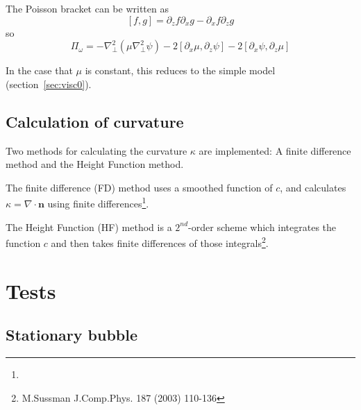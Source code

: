 \documentclass[12pt,a4paper]{article}
\newcommand{\lr}[1]{\left( #1 \right)}
\newcommand{\slr}[1]{\left[ #1 \right]}
\begin{document}
The Poisson bracket can be written as
\begin{equation}
\left[f, g\right] = \partial_zf\partial_xg - \partial_xf\partial_zg
\end{equation}
so
\begin{equation}
  \Pi_\omega = -\nabla_\perp^2\lr{\mu \nabla_\perp^2\psi} - 2\slr{\partial_x\mu,\partial_z\psi} - 2\slr{\partial_x\psi, \partial_z\mu}
\end{equation}

In the case that $\mu$ is constant, this reduces to the simple model (section~\ref{sec:visc0}).

\subsection{Calculation of curvature}
\label{sec:curvature}

Two methods for calculating the curvature $\kappa$ are implemented: A finite difference method and the Height Function method. 

The finite difference (FD) method uses a smoothed function of $c$, and calculates $\kappa = \nabla\cdot\mathbf{n}$ using finite differences\footnote{}.

The Height Function (HF) method is a $2^{nd}$-order scheme which integrates the function $c$ and then takes finite differences of those integrals\footnote{M.Sussman J.Comp.Phys. 187 (2003) 110-136}.
\section{Tests}

\subsection{Stationary bubble}
\end{document}
